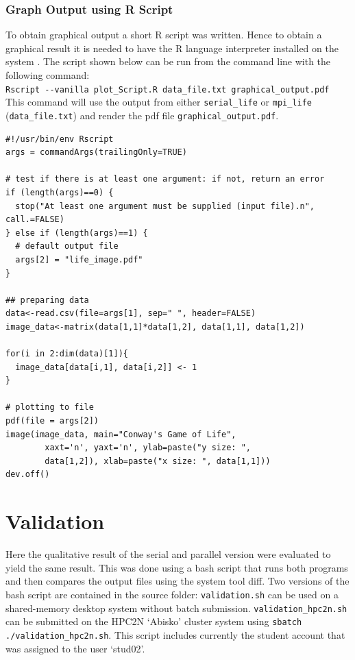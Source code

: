 \documentclass[a4paper,11pt,twoside,table,xcdraw]{article}
\begin{document}
\subsubsection{Graph Output using R Script}
To obtain graphical output a short R script was written. Hence to obtain a graphical result it is needed to have the R language interpreter installed on the system \cite{rlanguage}. The script shown below can be run from the command line with the following command:\\
\verb+Rscript --vanilla plot_Script.R data_file.txt graphical_output.pdf+\\
This command will use the output from either \verb+serial_life+ or \verb+mpi_life+ (\verb+data_file.txt+) and render the pdf file \verb+graphical_output.pdf+.   
\begin{verbatim}
#!/usr/bin/env Rscript
args = commandArgs(trailingOnly=TRUE)

# test if there is at least one argument: if not, return an error
if (length(args)==0) {
  stop("At least one argument must be supplied (input file).n", call.=FALSE)
} else if (length(args)==1) {
  # default output file
  args[2] = "life_image.pdf"
}

## preparing data
data<-read.csv(file=args[1], sep=" ", header=FALSE)
image_data<-matrix(data[1,1]*data[1,2], data[1,1], data[1,2])

for(i in 2:dim(data)[1]){
  image_data[data[i,1], data[i,2]] <- 1
}

# plotting to file
pdf(file = args[2])
image(image_data, main="Conway's Game of Life", 
        xaxt='n', yaxt='n', ylab=paste("y size: ", 
        data[1,2]), xlab=paste("x size: ", data[1,1]))
dev.off()
\end{verbatim}

\section{Validation}
Here the qualitative result of the serial and parallel version were evaluated to yield the same result. This was done using a bash script that runs both programs and then compares the output files using the system tool diff. Two versions of the bash script are contained in the source folder: \verb+validation.sh+ can be used on a shared-memory desktop system without batch submission. \verb+validation_hpc2n.sh+ can be submitted on the HPC2N `Abisko' cluster system using \verb+sbatch ./validation_hpc2n.sh+. This script includes currently the student account that was assigned to the user `stud02'.
\end{document}

